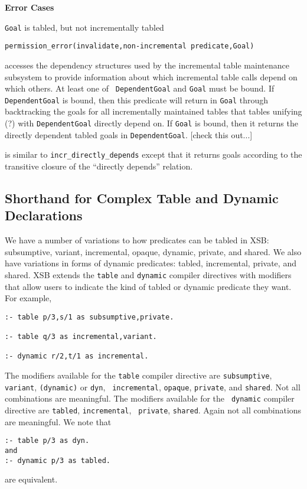 \begin{description}
{\bf Error Cases}
\bi
\item 	{\tt Goal} is tabled, but not incrementally tabled
\bi
\item 	{\tt permission\_error(invalidate,non-incremental predicate,Goal)}
\ei
\ei

accesses the dependency structures used by the incremental table
maintenance subsystem to provide information about which incremental
table calls depend on which others.  At least one of {\tt
DependentGoal} and {\tt Goal} must be bound.  If {\tt DependentGoal}
is bound, then this predicate will return in {\tt Goal} through
backtracking the goals for all incrementally maintained tables that
tables unifying (?) with {\tt DependentGoal} directly depend on.  If
{\tt Goal} is bound, then it returns the directly dependent tabled
goals in {\tt DependentGoal}.  [check this out...]

is similar to {\tt incr\_directly\_depends} except that it returns
goals according to the transitive closure of the ``directly depends''
relation.
\end{description}

\subsection{Shorthand for Complex Table and Dynamic Declarations}

We have a number of variations to how predicates can be tabled in XSB:
subsumptive, variant, incremental, opaque, dynamic, private, and
shared.  We also have variations in forms of dynamic predicates:
tabled, incremental, private, and shared.  XSB extends the {\tt table}
and {\tt dynamic} compiler directives with modifiers that allow users
to indicate the kind of tabled or dynamic predicate they want.  For
example,
\begin{verbatim}
:- table p/3,s/1 as subsumptive,private.

:- table q/3 as incremental,variant.

:- dynamic r/2,t/1 as incremental.
\end{verbatim}

\comment{
% 
% 
}
The modifiers available for the {\tt table} compiler directive are
{\tt subsumptive}, {\tt variant}, {\tt (dynamic)} or {\tt dyn}, {\tt
incremental}, {\tt opaque}, {\tt private}, and {\tt shared}.  Not all
combinations are meaningful.  The modifiers available for the {\tt
dynamic} compiler directive are {\tt tabled}, {\tt incremental}, {\tt
private}, {\tt shared}.  Again not all combinations are meaningful.
We note that
\begin{verbatim}
:- table p/3 as dyn.
and
:- dynamic p/3 as tabled.
\end{verbatim}
are equivalent.

